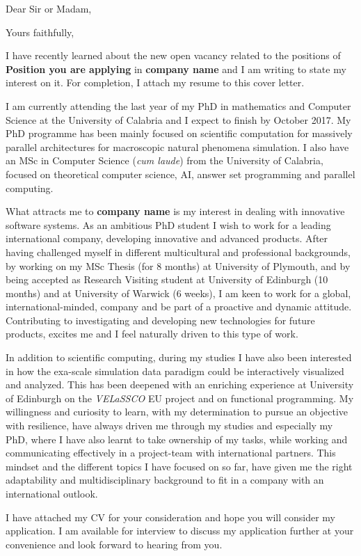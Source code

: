 \documentclass[12pt,a4paper,sans]{moderncv}        %
\begin{document}
\date{January 01, 1984}
\opening{Dear Sir or Madam,}
\closing{Yours faithfully,}
\makelettertitle
\justify
I have recently learned about the new open vacancy related to the positions of \textbf{Position you are applying} in \textbf{company name}
and I am writing to state my interest on it. For completion, I attach my resume to this cover letter.

I am currently attending the last year of my PhD in mathematics and Computer Science at the University of Calabria and I expect to finish by October 2017. My PhD programme has been mainly focused on scientific computation for massively parallel architectures for macroscopic natural phenomena simulation. I also have an MSc in Computer Science (\textit{cum laude}) from the University of Calabria, focused on theoretical computer science, AI, answer set programming and parallel computing.

What attracts me to \textbf{company name} is my interest in dealing with innovative software systems. As an ambitious
PhD student I wish to work for a leading international company, developing innovative and advanced products.
After having challenged myself in different multicultural and professional backgrounds, by working on my MSc Thesis (for 8 months) at University of Plymouth, and by being accepted as Research Visiting student at  University of Edinburgh (10 months) and at University of Warwick (6 weeks), I am keen to work for a global, international-minded, company and be part of a proactive and dynamic attitude. Contributing to investigating and developing new technologies for future products, excites me and
I feel naturally driven to this type of work.

In addition to scientific computing, during my studies I have also been interested in how the exa-scale simulation data paradigm could be interactively visualized and analyzed. This has been deepened with an enriching experience at University of Edinburgh on the \textit{VELaSSCO} EU project and on functional programming.
My willingness and curiosity to learn, with my determination to pursue an objective with resilience, have always driven me through my studies and especially my PhD, where I have also learnt to take ownership of my tasks, while working and communicating effectively in a project-team with international partners. This mindset and the different
topics I have focused on so far, have given me the right adaptability and multidisciplinary background to fit in a company with an international outlook.

I have attached my CV for your consideration and hope you will consider my application. I am available
for interview to discuss my application further at your convenience and look forward to hearing from you.


\makeletterclosing
\end{document}
